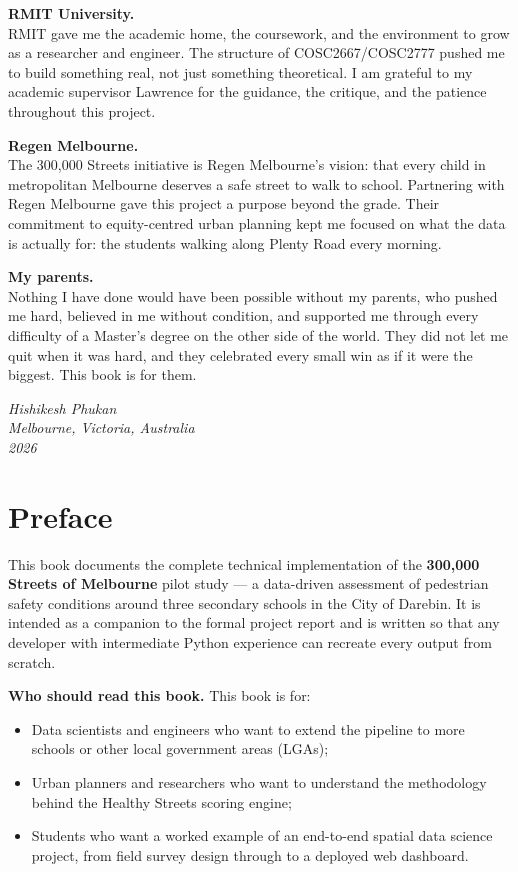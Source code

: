 \documentclass[11pt,a4paper,openany]{book}
\begin{document}
\bigskip
\noindent\textbf{RMIT University.}\\[0.3em]
RMIT gave me the academic home, the coursework, and the environment to grow as a
researcher and engineer.  The structure of COSC2667/COSC2777 pushed me to build
something real, not just something theoretical.  I am grateful to my academic
supervisor Lawrence for the guidance, the critique, and the patience throughout
this project.

\bigskip
\noindent\textbf{Regen Melbourne.}\\[0.3em]
The 300,000 Streets initiative is Regen Melbourne's vision: that every child in
metropolitan Melbourne deserves a safe street to walk to school.  Partnering with
Regen Melbourne gave this project a purpose beyond the grade.  Their commitment to
equity-centred urban planning kept me focused on what the data is actually for:
the students walking along Plenty Road every morning.

\bigskip
\noindent\textbf{My parents.}\\[0.3em]
Nothing I have done would have been possible without my parents, who pushed me hard,
believed in me without condition, and supported me through every difficulty of a
Master's degree on the other side of the world.  They did not let me quit when it was
hard, and they celebrated every small win as if it were the biggest.  This book is
for them.

\bigskip\bigskip
\begin{flushright}
\itshape
Hishikesh Phukan\\
Melbourne, Victoria, Australia\\
2026
\end{flushright}

\clearpage

\chapter*{Preface}

This book documents the complete technical implementation of the \textbf{300,000 Streets of Melbourne} pilot study --- a data-driven assessment of pedestrian safety conditions around three secondary schools in the City of Darebin. It is intended as a companion to the formal project report and is written so that any developer with intermediate Python experience can recreate every output from scratch.

\textbf{Who should read this book.}
This book is for:
\begin{itemize}
  \item Data scientists and engineers who want to extend the pipeline to more schools or other local government areas (LGAs);
  \item Urban planners and researchers who want to understand the methodology behind the Healthy Streets scoring engine;
  \item Students who want a worked example of an end-to-end spatial data science project, from field survey design through to a deployed web dashboard.
\end{itemize}
\end{document}
